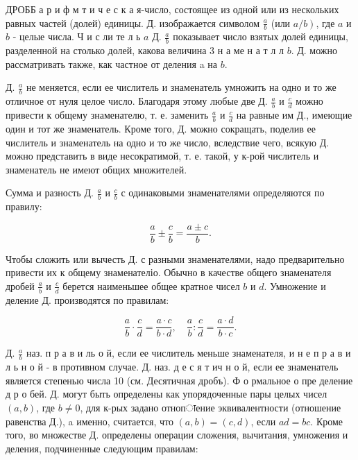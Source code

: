\documentclass[10pt]{article}
\begin{document}
ДРОББ а р и ф м т и ч е с к а я-число, состоящее из одной или из нескольких равных частей (долей) единицы. Д. изображается символом $\frac{a}{b}$ (или $\left.a / b\right)$, где $a$ и $b$ - целые числа. Ч и с ли те л ь $a$ Д. $\frac{a}{b}$ показывает число взятых долей единицы, разделенной на столько долей, какова величина 3 н а ме н а т л л $b$. Д. можно рассматривать также, как частное от деления a на $b$.



Д. $\frac{a}{b}$ не меняется, если ее числитель и знаменатель умножить на одно и то же отличное от нуля целое число. Благодаря этому любые две Д. $\frac{a}{b}$ и $\frac{c}{d}$ можно привести к общему знаменателю, т. е. заменить $\frac{a}{b}$ и $\frac{c}{d}$ на равные им Д., имеющие один и тот же знаменатель. Кроме того, Д. можно сокращать, поделив ее числитель и знаменатель на одно и то же число, вследствие чего, всякую Д. можно представить в виде несократимой, т. е. такой, у к-рой числитель и знаменатель не имеют общих множителей.



Сумма и разность Д. $\frac{a}{b}$ и $\frac{c}{b}$ с одинаковыми знаменателями определяются по правилу:



\[

\frac{a}{b} \pm \frac{c}{b}=\frac{a \pm c}{b} .

\]



Чтобы сложить или вычесть Д. с разными знаменателями, надо предварительно привести их к общему знаменателіо. Обычно в качестве общего знаменателя дробей $\frac{a}{b}$ и $\frac{c}{d}$ берется наименьшее общее кратное чисел $b$ и $d$. Умножение и деление Д. производятся по правилам:



\[

\frac{a}{b} \cdot \frac{c}{d}=\frac{a \cdot c}{b \cdot d}, \quad \frac{a}{b}: \frac{c}{d}=\frac{a \cdot d}{b \cdot c} .

\]



Д. $\frac{a}{b}$ наз. п р а в и ль о й, если ее числитель меньше знаменателя, и н е п р а в и л ь н о й - в противном случае. Д. наз. д е с я т ич н о й, если ее знаменатель является степенью числа 10 (см. Десятичная дробъ). Ф о рмальное о пре деление д р о бей. Д. могут быть определены как упорядоченные пары целых чисел $(a, b)$, где $b \neq 0$, для к-рых задано отнопाение эквивалентности (отношение равенства Д.), a именно, считается, что $(a, b)=(c, d)$, если $a d=b c$. Кроме того, во множестве Д. определены операции сложения, вычитания, умножения и деления, подчиненные следующим правилам:
\end{document}
